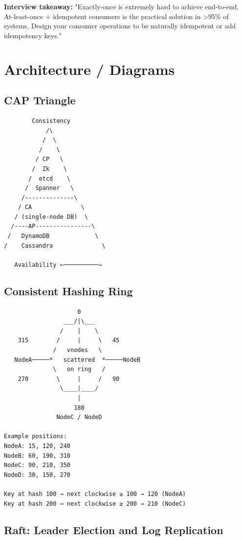 \documentclass[11pt]{article}
\begin{document}
\textbf{Interview takeaway:} "Exactly-once is extremely hard to achieve end-to-end. At-least-once + idempotent consumers is the practical solution in \textgreater95\% of systems. Design your consumer operations to be naturally idempotent or add idempotency keys."

\section{Architecture / Diagrams}\label{architecture--diagrams}

\subsection{CAP Triangle}\label{cap-triangle}

\setcodelang{}

\begin{verbatim}
        Consistency
            /\
           /  \
          /    \
         / CP   \
        /  Zk    \
       /  etcd    \
      /  Spanner   \
     /--------------\
    / CA              \
   / (single-node DB)  \
  /----AP----------------\
 /   DynamoDB             \
/    Cassandra              \

   Availability ←──────────→
\end{verbatim}

\subsection{Consistent Hashing Ring}\label{consistent-hashing-ring}

\setcodelang{}

\begin{verbatim}
                     0
                 ___/|\___
                /    |    \
    315        /     |     \   45
              /   vnodes   \
   NodeA─────*   scattered  *─────NodeB
              \   on ring   /
    270        \     |     /   90
                \____|____/
                     |
                    180
               NodeC / NodeD

Example positions:
NodeA: 15, 120, 240
NodeB: 60, 190, 310
NodeC: 90, 210, 350
NodeD: 30, 150, 270

Key at hash 100 → next clockwise ≥ 100 → 120 (NodeA)
Key at hash 200 → next clockwise ≥ 200 → 210 (NodeC)
\end{verbatim}

\subsection{Raft: Leader Election and Log Replication}\label{raft-leader-election-and-log-replication}
\end{document}
